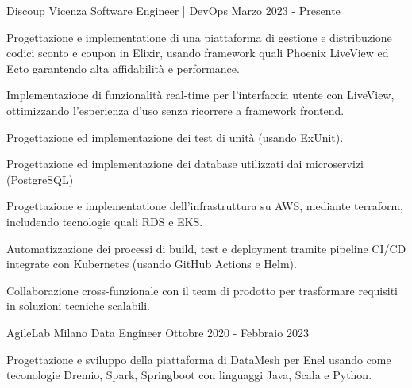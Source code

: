 \documentclass{resume} %
\begin{document}



\cvEntry
  {Discoup}
  {Vicenza}
  {Software Engineer | DevOps}
  {Marzo 2023 - Presente}{
    \begin{cvEntryItems}
      \item Progettazione e implementatione di una piattaforma di gestione e distribuzione
            codici sconto e coupon in Elixir, usando framework quali Phoenix LiveView ed Ecto
            garantendo alta affidabilità e performance.
      \item Implementazione di funzionalità real-time per l'interfaccia utente con LiveView,
            ottimizzando l'esperienza d'uso senza ricorrere a framework frontend.
      \item Progettazione ed implementazione dei test di unit\`a (usando ExUnit).
      \item Progettazione ed implementazione dei database utilizzati dai microservizi (PostgreSQL)
      \item Progettazione e implementatione dell'infrastruttura su AWS, mediante terraform,
            includendo tecnologie quali RDS e EKS.
      \item Automatizzazione dei processi di build, test e deployment tramite pipeline CI/CD
            integrate con Kubernetes (usando GitHub Actions e Helm).
      \item Collaborazione cross-funzionale con il team di prodotto per trasformare requisiti
            in soluzioni tecniche scalabili.
    \end{cvEntryItems}
}

\cvEntry
  {AgileLab}
  {Milano}
  {Data Engineer}
  {Ottobre 2020 - Febbraio 2023}{
    \begin{cvEntryItems}
      \item Progettazione e sviluppo della piattaforma di DataMesh per Enel usando come
            teconologie Dremio, Spark, Springboot con linguaggi Java, Scala e Python.
    \end{cvEntryItems}
}

\end{document}
